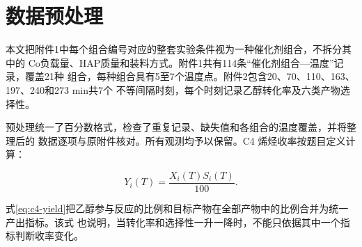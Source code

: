 \section{数据预处理}\label{sec:data}

本文把附件1中每个组合编号对应的整套实验条件视为一种催化剂组合，不拆分其中的
Co负载量、HAP质量和装料方式。附件1共有114条“催化剂组合—温度”记录，覆盖21种
组合，每种组合具有5至7个温度点。附件2包含20、70、110、163、197、240和273 min共7个
不等间隔时刻，每个时刻记录乙醇转化率及六类产物选择性。

预处理统一了百分数格式，检查了重复记录、缺失值和各组合的温度覆盖，并将整理后的
数据逐项与原附件核对。所有观测均予以保留。C4 烯烃收率按题目定义计算：

\begin{equation}
Y_i(T)=\frac{X_i(T)S_i(T)}{100}.
\tag{1}
\label{eq:c4-yield}
\end{equation}

式\eqref{eq:c4-yield}把乙醇参与反应的比例和目标产物在全部产物中的比例合并为统一
产出指标。该式
也说明，当转化率和选择性一升一降时，不能只依据其中一个指标判断收率变化。
